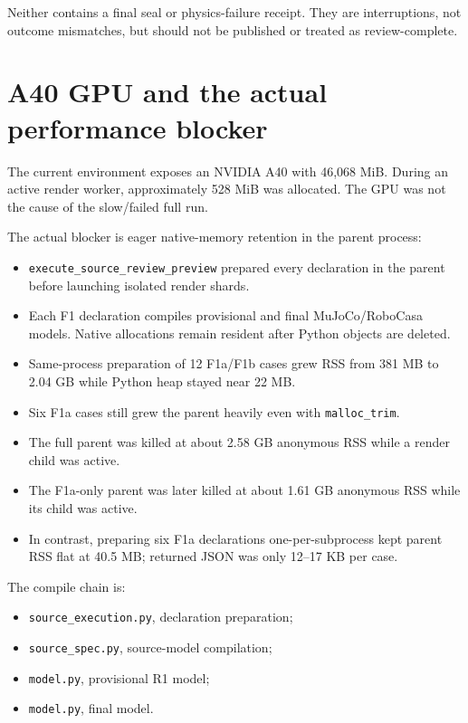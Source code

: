 \documentclass[11pt]{article}
\begin{document}
Neither contains a final seal or physics-failure receipt.  They are
interruptions, not outcome mismatches, but should not be published or treated
as review-complete.

\section{A40 GPU and the actual performance blocker}

The current environment exposes an NVIDIA A40 with 46,068 MiB.  During an
active render worker, approximately 528 MiB was allocated.  The GPU was not
the cause of the slow/failed full run.

The actual blocker is eager native-memory retention in the parent process:

\begin{itemize}
  \item \texttt{execute\_source\_review\_preview} prepared every declaration
        in the parent before launching isolated render shards.
  \item Each F1 declaration compiles provisional and final MuJoCo/RoboCasa
        models.  Native allocations remain resident after Python objects are
        deleted.
  \item Same-process preparation of 12 F1a/F1b cases grew RSS from 381 MB to
        2.04 GB while Python heap stayed near 22 MB.
  \item Six F1a cases still grew the parent heavily even with
        \texttt{malloc\_trim}.
  \item The full parent was killed at about 2.58 GB anonymous RSS while a
        render child was active.
  \item The F1a-only parent was later killed at about 1.61 GB anonymous RSS
        while its child was active.
  \item In contrast, preparing six F1a declarations one-per-subprocess kept
        parent RSS flat at 40.5 MB; returned JSON was only 12--17 KB per case.
\end{itemize}

The compile chain is:

\begin{itemize}
  \item \texttt{source\_execution.py}, declaration preparation;
  \item \texttt{source\_spec.py}, source-model compilation;
  \item \texttt{model.py}, provisional R1 model;
  \item \texttt{model.py}, final model.
\end{itemize}
\end{document}
